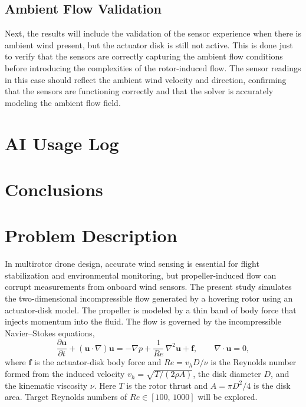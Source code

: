 \documentclass[
  aapm,
  amsmath,amssymb,
  reprint,          %
  floatfix
]{revtex4-2}
\begin{document}
\subsection{Ambient Flow Validation}
Next, the results will include the validation of the sensor experience when there is
ambient wind present, but the actuator disk is still not active. This is done just to verify
that the sensors are correctly capturing the ambient flow conditions before
introducing the complexities of the rotor-induced flow. The sensor readings in this case
should reflect the ambient wind velocity and direction, confirming that the sensors are
functioning correctly and that the solver is accurately modeling the ambient flow field.

\section{AI Usage Log}

\section{Conclusions}

\section{Problem Description}

In multirotor drone design, accurate wind sensing is essential for flight stabilization
and environmental monitoring, but propeller-induced flow can corrupt measurements
from onboard wind sensors.  The present study simulates the two-dimensional incompressible
flow generated by a hovering rotor using an actuator-disk model. The propeller is modeled
by a thin band of body force that injects momentum into the fluid.
The flow is governed by the incompressible Navier--Stokes equations,
\begin{equation}
  \frac{\partial \mathbf{u}}{\partial t}
  + (\mathbf{u}\cdot\nabla)\mathbf{u}
  = -\nabla p + \frac{1}{Re}\,\nabla^{2}\mathbf{u} + \mathbf{f},
  \qquad \nabla\cdot\mathbf{u} = 0,
\end{equation}
where $\mathbf{f}$ is the actuator-disk body force and
$Re = v_{h} D / \nu$ is the Reynolds number formed from the induced velocity
$v_{h} = \sqrt{T/(2\rho A)}$, the disk diameter $D$, and the kinematic viscosity $\nu$.
Here $T$ is the rotor thrust and $A = \pi D^{2}/4$ is the disk area.
Target Reynolds numbers of $Re \in [100,\,1000]$ will be explored.
\end{document}
